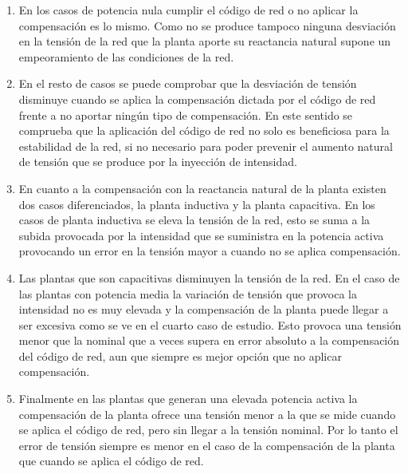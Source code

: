 \documentclass{book}
\begin{document}
\begin{enumerate}[1.]

\item En los casos de potencia nula cumplir el c\'odigo de red o no aplicar la compensaci\'on es lo mismo. Como no se produce tampoco ninguna desviaci\'on en la tensi\'on de la red que la planta aporte su reactancia natural supone un empeoramiento de las condiciones de la red. \par

 \item En el resto de casos se puede comprobar que la desviaci\'on de tensi\'on disminuye cuando se aplica la compensaci\'on dictada por el c\'odigo de red frente a no aportar ning\'un tipo de compensaci\'on. En este sentido se comprueba que la aplicaci\'on del c\'odigo de red no solo es beneficiosa para la estabilidad de la red, si no necesario para poder prevenir el aumento natural de tensi\'on que se produce por la inyecci\'on de intensidad. \par

\item En cuanto a la compensaci\'on con la reactancia natural de la planta existen dos casos diferenciados, la planta inductiva y la planta capacitiva. En los casos de planta inductiva se eleva la tensi\'on de la red, esto se suma a la subida provocada por la intensidad que se suministra en la potencia activa provocando un error en la tensi\'on mayor a cuando no se aplica compensaci\'on. \par

\item Las plantas que son capacitivas disminuyen la tensi\'on de la red. En el caso de las plantas con potencia media la variaci\'on de tensi\'on que provoca la intensidad no es muy elevada y la compensaci\'on de la planta puede llegar a ser excesiva como se ve en el cuarto caso de estudio. Esto provoca una tensi\'on menor que la nominal que a veces supera en error absoluto a la compensaci\'on del c\'odigo de red, aun que siempre es mejor opci\'on que no aplicar compensaci\'on. \par

\item Finalmente en las plantas que generan una elevada potencia activa la compensaci\'on de la planta ofrece una tensi\'on menor a la que se mide cuando se aplica el c\'odigo de red, pero sin llegar a la tensi\'on nominal. Por lo tanto el error de tensi\'on siempre es menor en el caso de la compensaci\'on de la planta que cuando se aplica el c\'odigo de red. \par


\end{enumerate}
\end{document}
